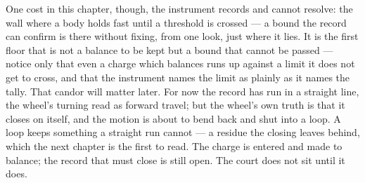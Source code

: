 One cost in this chapter, though, the instrument records and cannot resolve: the wall where a body holds fast
until a threshold is crossed --- a bound the record can confirm is there without fixing, from one look, just
where it lies. It is the first floor that is not a balance to be kept but a bound that cannot be passed --- notice only that even
a charge which balances runs up against a limit it does not get to cross, and that the instrument names the
limit as plainly as it names the tally. That candor will matter later. For now the record has run in a straight
line, the wheel's turning read as forward travel; but the wheel's own truth is that it closes on itself, and
the motion is about to bend back and shut into a loop. A loop keeps something a straight run cannot --- a
residue the closing leaves behind, which the next chapter is the first to read. The charge is entered and made
to balance; the record that must close is still open. The court does not sit until it does.

